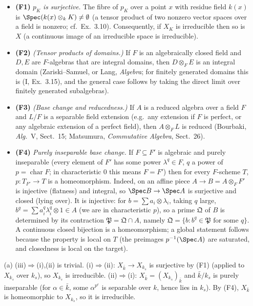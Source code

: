 \documentclass[11pt]{article}
\begin{document}
\begin{itemize}
\item \textbf{(F1)} \emph{$p_K$ is surjective.} The fibre of $p_K$ over a point $x$ with residue field $k(x)$ is $\Spec(k(x)\otimes_kK)\ne\emptyset$ (a tensor product of two nonzero vector spaces over a field is nonzero; cf.\ Ex.~3.10). Consequently, if $X_K$ is irreducible then so is $X$ (a continuous image of an irreducible space is irreducible).
\item \textbf{(F2)} \emph{(Tensor products of domains.)} If $F$ is an algebraically closed field and $D,E$ are $F$-algebras that are integral domains, then $D\otimes_FE$ is an integral domain (Zariski--Samuel, or Lang, \emph{Algebra}; for finitely generated domains this is (I, Ex.~3.15), and the general case follows by taking the direct limit over finitely generated subalgebras).
\item \textbf{(F3)} \emph{(Base change and reducedness.)} If $A$ is a reduced algebra over a field $F$ and $L/F$ is a separable field extension (e.g.\ any extension if $F$ is perfect, or any algebraic extension of a perfect field), then $A\otimes_FL$ is reduced (Bourbaki, \emph{Alg.}~V, Sect.~15; Matsumura, \emph{Commutative Algebra}, Sect.~26).
\item \textbf{(F4)} \emph{Purely inseparable base change.} If $F\subseteq F'$ is algebraic and purely inseparable (every element of $F'$ has some power $\lambda^{q}\in F$, $q$ a power of $p=\operatorname{char}F$; in characteristic $0$ this means $F=F'$) then for every $F$-scheme $T$, $p:T_{F'}\to T$ is a homeomorphism. Indeed, on an affine piece $A\to B=A\otimes_FF'$ is injective (flatness) and integral, so $\Spec B\to\Spec A$ is surjective and closed (lying over). It is injective: for $b=\sum a_i\otimes\lambda_i$, taking $q$ large, $b^q=\sum a_i^q\lambda_i^q\otimes1\in A$ (we are in characteristic $p$), so a prime $\mathfrak Q$ of $B$ is determined by its contraction $\mathfrak P=\mathfrak Q\cap A$, namely $\mathfrak Q=\{b:b^q\in\mathfrak P\text{ for some }q\}$. A continuous closed bijection is a homeomorphism; a global statement follows because the property is local on $T$ (the preimages $p^{-1}(\Spec A)$ are saturated, and closedness is local on the target).
\end{itemize}

(a) (iii)$\Rightarrow$(i),(ii) is trivial. (i)$\Rightarrow$(ii): $X_{\bar k}\to X_{k_s}$ is surjective by (F1) (applied to $X_{k_s}$ over $k_s$), so $X_{k_s}$ is irreducible. (ii)$\Rightarrow$(i): $X_{\bar k}=(X_{k_s})_{\bar k}$ and $\bar k/k_s$ is purely inseparable (for $\alpha\in\bar k$, some $\alpha^{p^e}$ is separable over $k$, hence lies in $k_s$). By (F4), $X_{\bar k}$ is homeomorphic to $X_{k_s}$, so it is irreducible.
\end{document}
